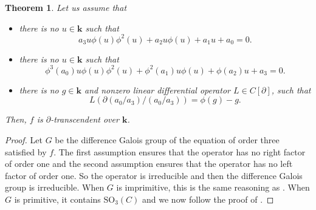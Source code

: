 \documentclass[a4paper,11pt]{amsart}
\newtheorem{thm}{Theorem}[section]
\def\k{\mathbf{k}}
\begin{document}
\begin{thm}

Let us assume that 
\begin{itemize}
\item there is no $u\in \k$ such that
$$a_3 u\phi(u)\phi^2 (u)+a_2 u\phi(u)+ a_1 u+a_0=0.$$
\item there is no $u\in \k$ such that
$$\phi^3(a_0) u\phi(u)\phi^2 (u)+\phi^2(a_1) u\phi(u)+ \phi(a_2) u+a_3=0.$$
\item there is no $g\in \k$ and nonzero linear differential operator $L\in C[\partial]$, such that  
$$L(\partial (a_0/a_3 )/(a_0/a_3))=\phi(g)-g. $$
\end{itemize}
Then,  $f$ is $\partial$-transcendent over $\k$.
\end{thm}

\begin{proof}
Let $G$ be the difference Galois group of the equation of order three satisfied by $f$.  The first assumption ensures that the operator has no right factor of order one and the second assumption ensures that the operator has no left factor of order one.  So the operator is irreducible and then the difference Galois group is irreducible.  When $G$ is  imprimitive, this is the same reasoning as \cite[Theorem 3.5]{arreche2021differential}.  When $G$ is primitive, it contains $\mathrm{SO}_3 (C)$ and   we now follow the proof  of \cite[Theorem 3.5]{arreche2021differential}. 
\end{proof}



\end{document}
